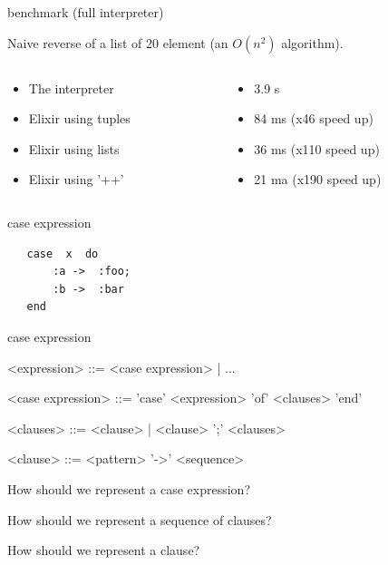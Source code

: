 \begin{frame}{benchmark (full interpreter)}

\pause Naive reverse of a list of 20 element (an $O(n^2)$ algorithm).

\begin{columns}
 \begin{column}{0.5\linewidth}
  \begin{itemize}
   \pause \item The interpreter
   \pause \item Elixir using tuples
   \pause \item Elixir using lists
   \pause \item Elixir using '++'
  \end{itemize}
 \end{column}
 \begin{column}{0.5\linewidth}
  \begin{itemize}
   \pause \item 3.9 s
   \pause \item 84 ms (x46 speed up)  
   \pause \item 36 ms (x110 speed up) 
   \pause \item 21 ma (x190 speed up) 
  \end{itemize}
 \end{column}
\end{columns}

\vspace{20pt}

\end{frame}

\begin{frame}[fragile]{case expression}

\begin{verbatim}
   case  x  do 
       :a ->  :foo;
       :b ->  :bar
   end
\end{verbatim}

\end{frame}

\begin{frame}{case expression}

\begin{grammar}
     <expression> ::=  <case expression> | ...  

     <case expression> ::= 'case' <expression> 'of' <clauses>  'end' 

     <clauses> ::=   <clause> | <clause> ';' <clauses>

     <clause> ::=  <pattern> '->' <sequence>
\end{grammar}

\pause How should we represent a case expression? 

\pause How should we represent a sequence of clauses?

\pause How should we represent a clause?

\end{frame}



